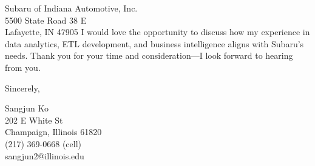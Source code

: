 \documentclass{letter}
\begin{document}
\begin{letter}{
    Subaru of Indiana Automotive, Inc.\\
    5500 State Road 38 E\\
    Lafayette, IN 47905
}
I would love the opportunity to discuss how my experience in data analytics, ETL development, and business intelligence aligns with Subaru’s needs. Thank you for your time and consideration—I look forward to hearing from you.

\closing{Sincerely,
}

Sangjun Ko\\
202 E White St\\
Champaign, Illinois 61820\\
(217) 369-0668 (cell)\\sangjun2@illinois.edu
\end{letter}
\end{document}
